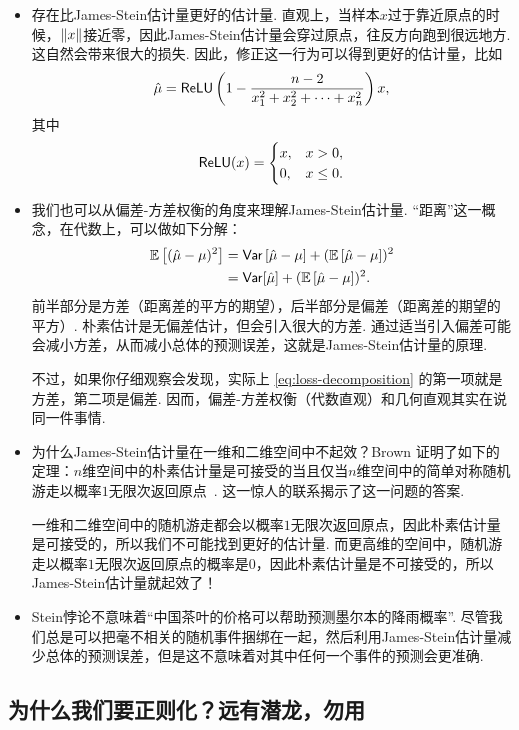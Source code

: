 \begin{itemize}
    \item 存在比James-Stein估计量更好的估计量. 直观上，当样本$x$过于靠近原点的时候，$\left\|x\right\|$接近零，因此James-Stein估计量会穿过原点，往反方向跑到很远地方. 这自然会带来很大的损失. 因此，修正这一行为可以得到更好的估计量，比如
    \[\hat\mu=\mathsf{ReLU}\left(1-\frac{n-2}{x_1^2+x_2^2+\dots+x_n^2}\right)x,\]
    其中
    \[\mathsf{ReLU}(x)=\begin{cases}
        x, & x>0,\\
        0, & x\leq 0.
    \end{cases}\]
    \item 我们也可以从偏差-方差权衡的角度来理解James-Stein估计量. “距离”这一概念，在代数上，可以做如下分解：
    \begin{align*}
    \mathbb{E}\left[(\hat{\mu}-\mu)^2\right] &= \mathsf{Var} \left[\hat{\mu}-\mu\right] + (\mathbb{E}\left[\hat{\mu}-\mu\right])^2 \\
    &= \mathsf{Var} [\hat{\mu}] + (\mathbb{E}\left[\hat{\mu}-\mu\right])^2.
    \end{align*}
    前半部分是方差（距离差的平方的期望），后半部分是偏差（距离差的期望的平方）. 朴素估计是无偏差估计，但会引入很大的方差. 通过适当引入偏差可能会减小方差，从而减小总体的预测误差，这就是James-Stein估计量的原理. 
    
    不过，如果你仔细观察会发现，实际上 \eqref{eq:loss-decomposition} 的第一项就是方差，第二项是偏差. 因而，偏差-方差权衡（代数直观）和几何直观其实在说同一件事情. 

    \item 为什么James-Stein估计量在一维和二维空间中不起效？Brown 证明了如下的定理：$n$维空间中的朴素估计量是可接受的当且仅当$n$维空间中的简单对称随机游走以概率$1$无限次返回原点~\cite{brownAdmissibleEstimatorsRecurrent1971}. 这一惊人的联系揭示了这一问题的答案. 
    
    一维和二维空间中的随机游走都会以概率$1$无限次返回原点，因此朴素估计量是可接受的，所以我们不可能找到更好的估计量. 而更高维的空间中，随机游走以概率$1$无限次返回原点的概率是$0$，因此朴素估计量是不可接受的，所以James-Stein估计量就起效了！

    \item Stein悖论不意味着“中国茶叶的价格可以帮助预测墨尔本的降雨概率”. 尽管我们总是可以把毫不相关的随机事件捆绑在一起，然后利用James-Stein估计量减少总体的预测误差，但是这不意味着对其中任何一个事件的预测会更准确. 
\end{itemize}

\subsection{为什么我们要正则化？远有潜龙，勿用}

